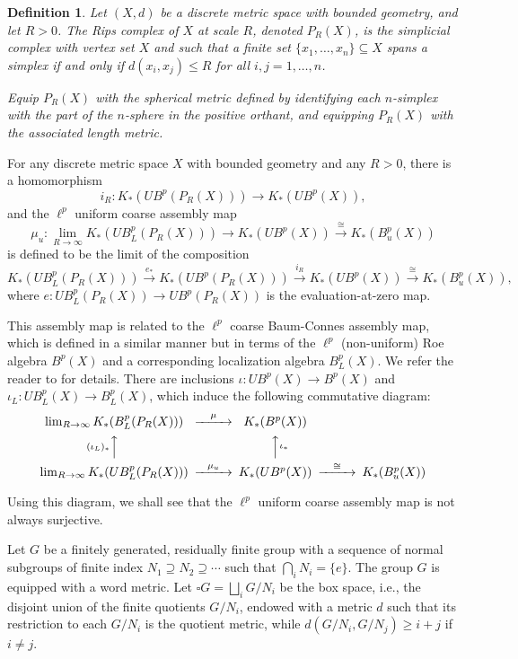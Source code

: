 \documentclass[a4,11pt]{amsart}
\newtheorem{defn}[thm]{Definition}
\theoremstyle{remark}
\begin{document}
\begin{defn}
Let $(X,d)$ be a discrete metric space with bounded geometry, and let $R>0$. The Rips complex of $X$ at scale $R$, denoted $P_R(X)$, is the simplicial complex with vertex set $X$ and such that a finite set $\{x_1,\ldots,x_n\}\subseteq X$ spans a simplex if and only if $d(x_i,x_j)\leq R$ for all $i,j=1,\ldots,n$.

Equip $P_R(X)$ with the spherical metric defined by identifying each $n$-simplex with the part of the $n$-sphere in the positive orthant, and equipping $P_R(X)$ with the associated length metric.
\end{defn}

For any discrete metric space $X$ with bounded geometry and any $R>0$, there is a homomorphism 
\[ i_R:K_*(UB^p(P_R(X)))\rightarrow K_*(UB^p(X)), \] 
and the $\ell^p$ uniform coarse assembly map
\[ \mu_u:\lim_{R\rightarrow\infty}K_*(UB^p_L(P_R(X)))\rightarrow K_*(UB^p(X)) \stackrel{\cong}{\rightarrow} K_*(B^p_u(X)) \]
is defined to be the limit of the composition
\[ K_*(UB^p_L(P_R(X)))\stackrel{e_*}{\rightarrow} K_*(UB^p(P_R(X)))\stackrel{i_R}{\rightarrow} K_*(UB^p(X))\stackrel{\cong}{\rightarrow} K_*(B^p_u(X)), \]
where $e:UB^p_L(P_R(X))\rightarrow UB^p(P_R(X))$ is the evaluation-at-zero map.

This assembly map is related to the $\ell^p$ coarse Baum-Connes assembly map, which is defined in a similar manner but in terms of the $\ell^p$ (non-uniform) Roe algebra $B^p(X)$ and a corresponding localization algebra $B^p_L(X)$.
We refer the reader to \cite[Section 2.1]{Chung23} for details.
There are inclusions $\iota:UB^p(X)\rightarrow B^p(X)$ and $\iota_L:UB^p_L(X)\rightarrow B^p_L(X)$, which induce the following commutative diagram:
\[
\begin{CD}
\lim_{R\rightarrow\infty}K_*(B^p_L(P_R(X)))	@>\mu>>	K_*(B^p(X)) \\
@A(\iota_L)_*AA  @AA\iota_*A \\
\lim_{R\rightarrow\infty}K_*(UB^p_L(P_R(X)))	@>\mu_u>>	K_*(UB^p(X)) @>\cong>> K_*(B^p_u(X))
\end{CD}
\]

Using this diagram, we shall see that the $\ell^p$ uniform coarse assembly map is not always surjective.

Let $G$ be a finitely generated, residually finite group with a sequence of normal subgroups of finite index $N_1\supseteq N_2\supseteq \cdots$ such that $\bigcap_i N_i=\{e\}$. The group $G$ is equipped with a word metric. Let $\square G=\bigsqcup_i G/N_i$ be the box space, i.e., the disjoint union of the finite quotients $G/N_i$, endowed with a metric $d$ such that its restriction to each $G/N_i$ is the quotient metric, while $d(G/N_i,G/N_j)\geq i+j$ if $i\neq j$.
\end{document}
